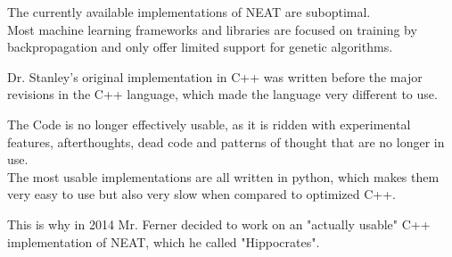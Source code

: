 The currently available implementations of NEAT are suboptimal. \\
Most machine learning frameworks and libraries are focused on training by backpropagation and only offer limited support for genetic algorithms.

Dr. Stanley's original implementation in C++ \cite{Stanley2010} was written before the major revisions in the
C++ language, which made the language very different to use. \cite{Stroustrup2013}

The Code is no longer effectively usable, as it is ridden with experimental features, afterthoughts, dead code and patterns of thought that are no longer in use. \\
The most usable implementations are all written in python, which makes them very easy to use but also very slow when compared to optimized C++.

This is why in 2014 Mr. Ferner decided to work on an "actually usable" C++ implementation of NEAT,
which he called "Hippocrates".
